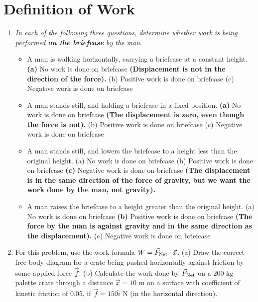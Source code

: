 \documentclass[10pt]{article}
\begin{document}
\maketitle

\section{Definition of Work}
\begin{enumerate}
\item \textit{In each of the following three questions, determine whether work is being performed \textbf{on the briefcase} by the man}.
\begin{itemize}
\item A man is walking horizontally, carrying a briefcase at a constant height. \textbf{(a)} No work is done on briefcase \textbf{(Displacement is not in the direction of the force).} (b) Positive work is done on briefcase (c) Negative work is done on briefcase
\item A man stands still, and holding a briefcase in a fixed position.  \textbf{(a)} No work is done on briefcase \textbf{(The displacement is zero, even though the force is not).} (b) Positive work is done on briefcase (c) Negative work is done on briefcase
\item A man stands still, and lowers the briefcase to a height less than the original height.  (a) No work is done on briefcase (b) Positive work is done on briefcase \textbf{(c)} Negative work is done on briefcase \textbf{(The displacement is in the same direction of the force of gravity, but we want the work done by the man, not gravity).}
\item A man raises the briefcase to a height greater than the original height.  (a) No work is done on briefcase \textbf{(b)} Positive work is done on briefcase \textbf{(The force by the man is against gravity and in the same direction as the displacement).} (c) Negative work is done on briefcase
\end{itemize}
\item For this problem, use the work formula $W = \vec{F}_{\rm Net} \cdot \vec{x}$.  (a) Draw the correct free-body diagram for a crate being pushed horizontally against friction by some applied force $\vec{f}$.  (b) Calculate the work done by $\vec{F}_{\rm Net}$ on a 200 kg palette crate through a distance $\vec{x} = 10$ m on a surface with coefficient of kinetic friction of 0.05, if $\vec{f} = 150\hat{i}$ N (in the horizontal direction).  \\
\begin{figure}[ht]

\end{figure}
\end{enumerate}
\end{document}
